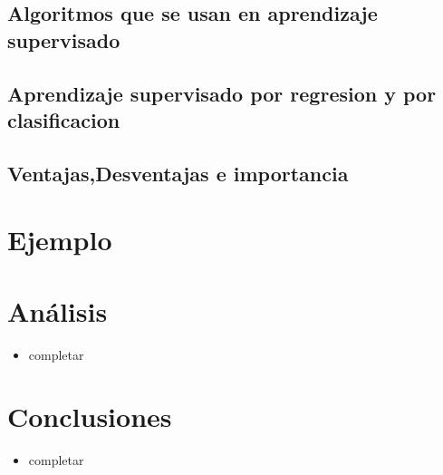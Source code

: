 \documentclass[%
 reprint,
 amsmath,amssymb,
 aps,
]{revtex4-1}
\begin{document}
\subsection{Algoritmos que se usan en aprendizaje supervisado}	


\subsection{Aprendizaje supervisado por regresion y por clasificacion}

\subsection{Ventajas,Desventajas e importancia}



\section{Ejemplo}

\section{Análisis}

\begin{itemize}
\item
completar

\end{itemize}
\section{Conclusiones}

\begin{itemize}
\item 
completar

\end{itemize}


\end{document}
